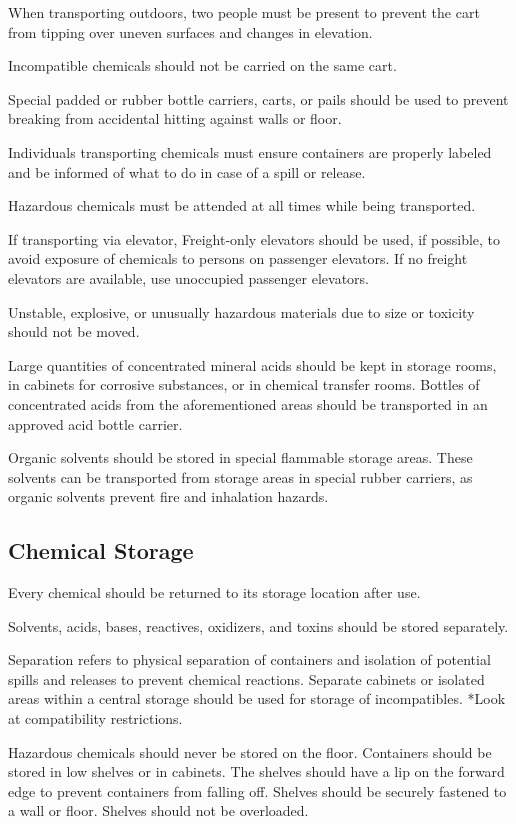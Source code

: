 \documentclass[12pt]{../SOP3_beta}\usepackage[]{graphicx}\usepackage[]{color}
\begin{document}
\NP When transporting outdoors, two people must be present to prevent the cart from tipping over uneven surfaces and changes in elevation.

\NP Incompatible chemicals should not be carried on the same cart. 

\NP Special padded or rubber bottle carriers, carts, or pails should be used to prevent breaking from accidental hitting against walls or floor. 

\NP Individuals transporting chemicals must ensure containers are properly labeled and be informed of what to do in case of a spill or release. 

\NP Hazardous chemicals must be attended at all times while being transported.

\NP If transporting via elevator, Freight-only elevators should be used, if possible, to avoid exposure of chemicals to persons on passenger elevators. If no freight elevators are available, use unoccupied passenger elevators.  

\NP Unstable, explosive, or unusually hazardous materials due to size or toxicity should not be moved. 

\NP Large quantities of concentrated mineral acids should be kept in storage rooms, in cabinets for corrosive substances, or in chemical transfer rooms. Bottles of concentrated acids from the aforementioned areas should be transported in an approved acid bottle carrier. 

\NP Organic solvents should be stored in special flammable storage areas. These solvents can be transported from storage areas in special rubber carriers, as organic solvents prevent fire and inhalation hazards. 

\subsection*{Chemical Storage}

\NP Every chemical should be returned to its storage location after use. 

\NP Solvents, acids, bases, reactives, oxidizers, and toxins should be stored separately.

\NP Separation refers to physical separation of containers and isolation of potential spills and releases to prevent chemical reactions. Separate cabinets or isolated areas within a central storage should be used for storage of incompatibles. *Look at compatibility restrictions. 

\NP Hazardous chemicals should never be stored on the floor. Containers should be stored in low shelves or in cabinets. The shelves should have a lip on the forward edge to prevent containers from falling off. Shelves should be securely fastened to a wall or floor. Shelves should not be overloaded.
\end{document}
